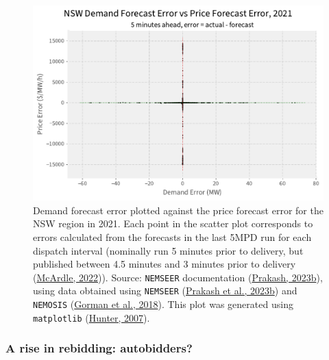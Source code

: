 \documentclass[12pt,a4paper,]{report}
\begin{document}
\begin{figure}
\hypertarget{fig:nsw_5min_price_demand_errors_2021}{%
\centering
\includegraphics{source/figures/NSW_demand_price_forecast_errors_300ahead_2021.pdf}
\caption[Demand vs price forecast errors from the last 5MPD run for NSW,
2021]{Demand forecast error plotted against the price forecast error for
the NSW region in 2021. Each point in the scatter plot corresponds to
errors calculated from the forecasts in the last 5MPD run for each
dispatch interval (nominally run 5 minutes prior to delivery, but
published between 4.5 minutes and 3 minutes prior to delivery
(\protect\hyperlink{ref-mcardleFileCreationTimes2022}{McArdle, 2022})).
Source: \texttt{NEMSEER} documentation
(\protect\hyperlink{ref-prakashEnergyPriceConvergence2023}{Prakash,
2023b}), using data obtained using \texttt{NEMSEER}
(\protect\hyperlink{ref-prakashNEMSEERPythonPackage2023}{Prakash et al.,
2023b}) and \texttt{NEMOSIS}
(\protect\hyperlink{ref-gormanNEMOSISNEMOpen2018}{Gorman et al., 2018}).
This plot was generated using \texttt{matplotlib}
(\protect\hyperlink{ref-hunterMatplotlib2DGraphics2007}{Hunter,
2007}).}\label{fig:nsw_5min_price_demand_errors_2021}
}
\end{figure}

\hypertarget{sec:info-case_study-price_forecast_errors-bidding_analysis}{%
\subsubsection{A rise in rebidding:
autobidders?}\label{sec:info-case_study-price_forecast_errors-bidding_analysis}}
\end{document}
